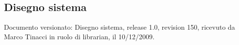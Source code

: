 \subsection{Disegno sistema}
Documento versionato: Disegno sistema, release 1.0, revision 150, ricevuto da
Marco Tinacci in ruolo di librarian, il 10/12/2009.